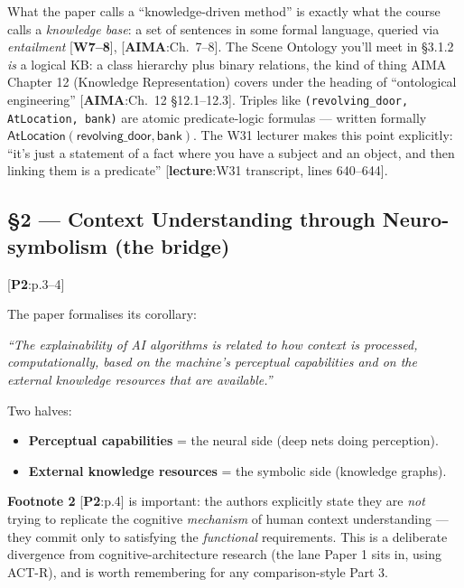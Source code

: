 \documentclass[11pt, a4paper]{article}
\newcommand{\paperref}[1]{\textcolor{srcBd}{\small[\textbf{P2}:#1]}}
\newcommand{\aimaref}[1]{\textcolor{srcBd}{\small[\textbf{AIMA}:#1]}}
\newcommand{\lectref}[1]{\textcolor{srcBd}{\small[\textbf{lecture}:#1]}}
\newcommand{\courseref}[1]{\textcolor{srcBd}{\small[\textbf{W#1}]}}
\begin{document}
\begin{notebox}
What the paper calls a ``knowledge-driven method'' is exactly what the course calls a \emph{knowledge base}: a set of sentences in some formal language, queried via \emph{entailment} \courseref{7--8}, \aimaref{Ch.\ 7--8}. The Scene Ontology you'll meet in §3.1.2 \emph{is} a logical KB: a class hierarchy plus binary relations, the kind of thing AIMA Chapter 12 (Knowledge Representation) covers under the heading of ``ontological engineering'' \aimaref{Ch.\ 12 §12.1--12.3}. Triples like \texttt{(revolving\_door, AtLocation, bank)} are atomic predicate-logic formulas — written formally \(\mathsf{AtLocation}(\mathsf{revolving\_door}, \mathsf{bank})\). The W31 lecturer makes this point explicitly: ``it's just a statement of a fact where you have a subject and an object, and then linking them is a predicate'' \lectref{W31 transcript, lines 640--644}.
\end{notebox}

\subsection{§2 — Context Understanding through Neuro-symbolism (the bridge)}
\paperref{p.3--4}

The paper formalises its corollary:

\begin{exbox}[Quote (\paperref{§2, p.3})]
\emph{``The explainability of AI algorithms is related to how context is processed, computationally, based on the machine's perceptual capabilities and on the external knowledge resources that are available.''}
\end{exbox}

Two halves:
\begin{itemize}
  \item \textbf{Perceptual capabilities} = the neural side (deep nets doing perception).
  \item \textbf{External knowledge resources} = the symbolic side (knowledge graphs).
\end{itemize}

\textbf{Footnote 2} \paperref{p.4} is important: the authors explicitly state they are \emph{not} trying to replicate the cognitive \emph{mechanism} of human context understanding — they commit only to satisfying the \emph{functional} requirements. This is a deliberate divergence from cognitive-architecture research (the lane Paper 1 sits in, using ACT-R), and is worth remembering for any comparison-style Part 3.
\end{document}
